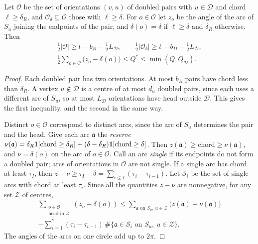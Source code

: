 \documentclass[11pt,colorlinks]{charlie}
\newcommand{\cD}{\mathcal{D}}
\begin{document}
\begin{lemma}[Budgets]\label{lem:budget}
Let $\mathcal O$ be the set of orientations $(v,u)$ of doubled pairs with $u\in\cD$ and chord $\ell\ge\delta_R$, and $\mathcal O_\delta\subseteq\mathcal O$ those with $\ell\ge\delta$. For $o\in\mathcal O$ let $z_o$ be the angle of the arc of $S_u$ joining the endpoints of the pair, and $\delta(o)=\delta$ if $\ell\ge\delta$ and $\delta_R$ otherwise. Then
\begin{gather*}
 \tfrac12|\mathcal O|\ge t-b_R-\tfrac12L_\cD,\qquad \tfrac12|\mathcal O_\delta|\ge t-b_D-\tfrac12L_\cD,\\
 \tfrac12\sum_{o\in\mathcal O}\big(z_o-\delta(o)\big)\le Q^*\le\min(Q,Q_\cD).
\end{gather*}
\end{lemma}

\begin{proof}
Each doubled pair has two orientations. At most $b_R$ pairs have chord less than $\delta_R$. A vertex $u\notin\cD$ is a centre of at most $d_u$ doubled pairs, since each uses a different arc of $S_u$, so at most $L_\cD$ orientations have head outside $\cD$. This gives the first inequality, and the second in the same way.

Distinct $o\in\mathcal O$ correspond to distinct arcs, since the arc of $S_u$ determines the pair and the head. Give each arc $\mathfrak a$ the \emph{reserve} $\nu(\mathfrak a)=\delta_R\mathbf{1}[\text{chord}\ge\delta_R]+(\delta-\delta_R)\mathbf{1}[\text{chord}\ge\delta]$. Then $z(\mathfrak a)\ge\text{chord}\ge\nu(\mathfrak a)$, and $\nu=\delta(o)$ on the arc of $o\in\mathcal O$. Call an arc \emph{single} if its endpoints do not form a doubled pair; arcs of orientations in $\mathcal O$ are not single. If a single arc has chord at least $\tau_I$, then $z-\nu\ge\tau_I-\delta=\sum_{i\le I}(\tau_i-\tau_{i-1})$. Let $\mathcal S_i$ be the set of single arcs with chord at least $\tau_i$. Since all the quantities $z-\nu$ are nonnegative, for any set $\mathcal Z$ of centres,
\begin{multline*}
 \sum_{\substack{o\in\mathcal O\\ \text{head in }\mathcal Z}}(z_o-\delta(o))\le\sum_{\mathfrak a\text{ on }S_u,\,u\in\mathcal Z}\big(z(\mathfrak a)-\nu(\mathfrak a)\big)\\
 -\sum_{i=1}^7(\tau_i-\tau_{i-1})\,\#\{\mathfrak a\in\mathcal S_i\text{ on }S_u,\ u\in\mathcal Z\}.
\end{multline*}
The angles of the arcs on one circle add up to $2\pi$.


\end{proof}
\end{document}
